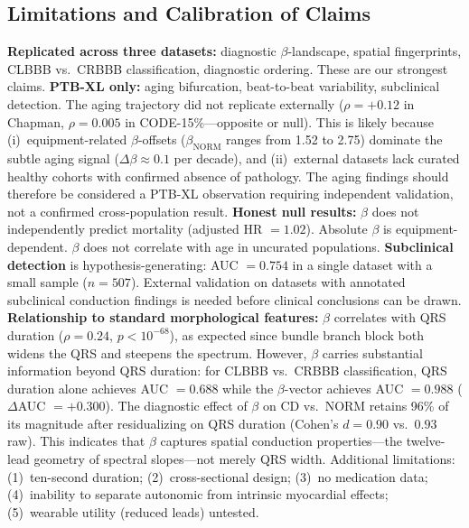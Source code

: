 \documentclass[11pt,a4paper]{article}
\begin{document}
\subsection{Limitations and Calibration of Claims}
\textbf{Replicated across three datasets:} diagnostic $\beta$-landscape, spatial fingerprints, CLBBB vs.\ CRBBB classification, diagnostic ordering. These are our strongest claims.
\textbf{PTB-XL only:} aging bifurcation, beat-to-beat variability, subclinical detection. The aging trajectory did not replicate externally ($\rho = +0.12$ in Chapman, $\rho = 0.005$ in CODE-15\%---opposite or null). This is likely because (i)~equipment-related $\beta$-offsets ($\beta_\text{NORM}$ ranges from 1.52 to 2.75) dominate the subtle aging signal ($\Delta\beta \approx 0.1$ per decade), and (ii)~external datasets lack curated healthy cohorts with confirmed absence of pathology. The aging findings should therefore be considered a PTB-XL observation requiring independent validation, not a confirmed cross-population result.
\textbf{Honest null results:} $\beta$ does not independently predict mortality (adjusted HR $= 1.02$). Absolute $\beta$ is equipment-dependent. $\beta$ does not correlate with age in uncurated populations.
\textbf{Subclinical detection} is hypothesis-generating: AUC $= 0.754$ in a single dataset with a small sample ($n = 507$). External validation on datasets with annotated subclinical conduction findings is needed before clinical conclusions can be drawn.
\textbf{Relationship to standard morphological features:} $\beta$ correlates with QRS duration ($\rho = 0.24$, $p < 10^{-68}$), as expected since bundle branch block both widens the QRS and steepens the spectrum. However, $\beta$ carries substantial information beyond QRS duration: for CLBBB vs.\ CRBBB classification, QRS duration alone achieves AUC $= 0.688$ while the $\beta$-vector achieves AUC $= 0.988$ ($\Delta$AUC $= +0.300$). The diagnostic effect of $\beta$ on CD vs.\ NORM retains 96\% of its magnitude after residualizing on QRS duration (Cohen's $d = 0.90$ vs.\ $0.93$ raw). This indicates that $\beta$ captures spatial conduction properties---the twelve-lead geometry of spectral slopes---not merely QRS width.
Additional limitations: (1)~ten-second duration; (2)~cross-sectional design; (3)~no medication data; (4)~inability to separate autonomic from intrinsic myocardial effects; (5)~wearable utility (reduced leads) untested.
\end{document}
